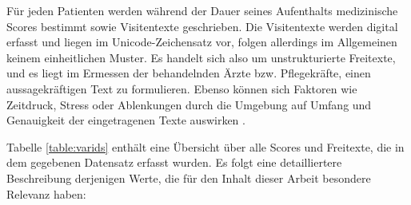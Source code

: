 Für jeden Patienten werden während der Dauer seines Aufenthalts medizinische Scores  bestimmt sowie Visitentexte geschrieben. Die Visitentexte werden digital erfasst und liegen im Unicode-Zeichensatz vor, folgen allerdings im Allgemeinen keinem einheitlichen Muster. Es handelt sich also um unstrukturierte Freitexte, und es liegt im Ermessen der behandelnden Ärzte bzw. Pflegekräfte, einen aussagekräftigen Text zu formulieren. Ebenso können sich Faktoren wie Zeitdruck, Stress oder Ablenkungen durch die Umgebung auf Umfang und Genauigkeit der eingetragenen Texte auswirken \citep{marxIntensivmedizin2015c}.

Tabelle \ref{table:varids} enthält eine Übersicht über alle Scores und Freitexte, die in dem gegebenen Datensatz erfasst wurden. Es folgt eine detailliertere Beschreibung derjenigen Werte, die für den Inhalt dieser Arbeit besondere Relevanz haben:

